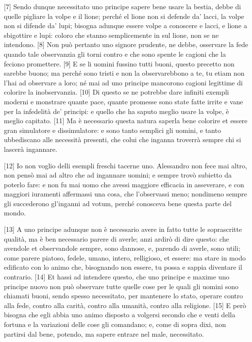 {[}7{]} Sendo dunque necessitato uno principe sapere bene usare la
bestia, debbe di quelle pigliare la volpe e il lione; perché el lione
non si defende da' lacci, la volpe non si difende da' lupi; bisogna
adunque essere volpe a conoscere e lacci, e lione a sbigottire e lupi:
coloro che stanno semplicemente in sul lione, non se ne intendono.
{[}8{]} Non può pertanto uno signore prudente, ne debbe, osservare la
fede quando tale observanzia gli torni contro e che sono spente le
cagioni che la feciono promettere. {[}9{]} E se li uomini fussino tutti
buoni, questo precetto non sarebbe buono; ma perché sono tristi e non la
observarebbono a te, tu etiam non l'hai ad observare a loro; né mai ad
uno principe mancorono cagioni legittime di colorire la inobservanzia.
{[}10{]} Di questo se ne potrebbe dare infiniti exempli moderni e
monstrare quante pace, quante promesse sono state fatte irrite e vane
per la infedelità de' principi: e quello che ha saputo meglio usare la
volpe, è meglio capitato. {[}11{]} Ma è necessario questa natura saperla
bene colorire et essere gran simulatore e dissimulatore: e sono tanto
semplici gli uomini, e tanto ubbediscano alle necessità presenti, che
colui che inganna troverrà sempre chi si lascerà ingannare.

{[}12{]} Io non voglio delli esempli freschi tacerne uno. Alessandro 
non fece mai altro, non pensò mai ad altro che ad ingannare uomini; e
sempre trovò subietto da poterlo fare: e non fu mai uomo che avessi
maggiore efficacia in asseverare, e con maggiori iuramenti affermassi
una cosa, che l'observassi meno; nondimeno sempre gli succederono
gl'inganni ad votum, perché conosceva bene questa parte del mondo.

\quebra

{[}13{]} A uno principe adunque non è necessario avere in fatto tutte le
soprascritte qualità, ma è ben necessario parere di averle; anzi ardirò
di dire questo: che avendole et observandole sempre, sono dannose, e,
parendo di averle, sono utili; come parere piatoso, fedele, umano,
intero, relligioso, et essere: ma stare in modo edificato con lo animo
che, bisognando non essere, tu possa e sappia diventare il contrario.
{[}14{]} Et hassi ad intendere questo, che uno principe e maxime uno
principe nuovo non può observare tutte quelle cose per le quali gli
uomini sono chiamati buoni, sendo spesso necessitato, per mantenere lo
stato, operare contro alla fede, contro alla carità, contro alla
umanità, contro alla religione. {[}15{]} E però bisogna che egli abbia
uno animo disposto a volgersi secondo che e venti della fortuna e la
variazioni delle cose gli comandano; e, come di sopra dixi, non partirsi
dal bene, potendo, ma sapere entrare nel male, necessitato.

